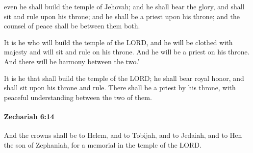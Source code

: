 			\begin{versebox}
					\item[BHS] 
					\item[LXX] 
					\item[ASV] even he shall build the temple of Jehovah; and he shall bear the glory, and shall sit and rule upon his throne; and he shall be a priest upon his throne; and the counsel of peace shall be between them both.
					\item[NIV] It is he who will build the temple of the LORD, and he will be clothed with majesty and will sit and rule on his throne. And he will be a priest on his throne. And there will be harmony between the two.’
					\item[NRSV] It is he that shall build the temple of the LORD; he shall bear royal honor, and shall sit upon his throne and rule. There shall be a priest by his throne, with peaceful understanding between the two of them.
			\end{versebox}

		\paragraph{Zechariah 6:14} %
			\label{ZECHARIAH-6-14}

			And the crowns shall be to Helem, and to Tobijah, and to Jedaiah, and to Hen the son of Zephaniah, for a memorial in the temple of the LORD.

